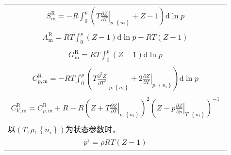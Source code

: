 \documentclass[main.tex]{subfiles}
\begin{document}
\begin{longtable}{m{}}
    \begin{align}S_\text{m}^\text{R}=-R\int_0^p\left(T\left.\frac{\partial Z}{\partial T}\right|_{p,\left\{n_i\right\}}+Z-1\right)\mathrm{d}\ln p\end{align}                                                                                                        \\[-8ex]
    \begin{align}A_\text{m}^\text{R}=RT\int_0^p\left(Z-1\right)\mathrm{d}\ln p-RT\left(Z-1\right)\end{align}                                                                                                                                                        \\ [-8ex]
    \begin{align}G_\text{m}^\text{R}=RT\int_0^p\left(Z-1\right)\mathrm{d}\ln p\end{align}                                                                                                                                                                           \\[-8ex]
    \begin{align}C_{p,\text{m}}^\text{R}  =-RT\int_0^p\left(T\left.\frac{\partial^2 Z}{\partial T^2}\right|_{p,\left\{n_i\right\}}+2\left.\frac{\partial Z}{\partial T}\right|_{p,\left\{n_i\right\}}\right)\mathrm{d}\ln p \end{align}                             \\ [-8ex]
    \begin{align}C_{V,\text{m}}^\text{R}  =C_{p,\text{m}}^\text{R}+R-R\left(Z+T\left.\frac{\partial Z}{\partial T}\right|_{p,\left\{n_i\right\}}\right)^2\left(Z-p\left.\frac{\partial Z}{\partial p}\right|_{T,\left\{n_i\right\}}\right)^{-1}\end{align}          \\
    以$\left(T,\rho,\left\{n_i\right\}\right)$为状态参数时，                                                                                                                                                                                                                \\ [-4ex]
    \begin{align}
        p^\text{r}               =\rho RT\left(Z-1\right)\end{align}                                                                                                                                                                                                    \\ [-8ex]

\end{longtable}
\end{document}
